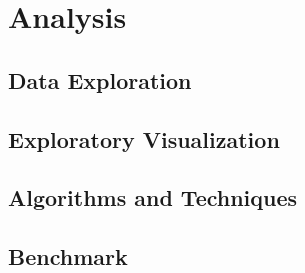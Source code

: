\section{Analysis}

\subsection{Data Exploration}

\subsection{Exploratory Visualization}

\subsection{Algorithms and Techniques}

\subsection{Benchmark}